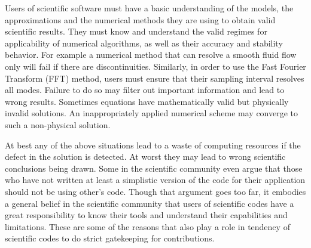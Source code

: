 \label{sec:using}
Users of scientific software must have a basic understanding of the
models, the approximations and the numerical methods they are using to
obtain valid scientific results. They must know and
understand the valid regimes for applicability of numerical
algorithms, as well as their accuracy and stability behavior. For
example a numerical method that can resolve a smooth 
fluid flow only will fail if there are discontinuities. Similarly, in
order to use the Fast Fourier Transform (FFT) method, users must
ensure that their sampling interval resolves all modes. Failure to do
so may filter out important information and lead to wrong results.
Sometimes equations have mathematically valid but physically invalid
solutions. An inappropriately applied numerical scheme may converge to
such a non-physical solution.  

At best any of the above situations lead to a waste of computing resources if the defect in
the solution is detected. At worst they may lead to wrong scientific
conclusions being drawn. Some in the scientific community even argue
that those who have not written at least a simplistic version of the
code for their application should not be using other's code. Though
that argument goes too far, it embodies a general belief in the
scientific community that users of scientific codes have a great
responsibility to know their tools and understand their capabilities
and limitations.  
These are some of the reasons that also play a role in tendency of scientific
codes to do strict gatekeeping for contributions.

